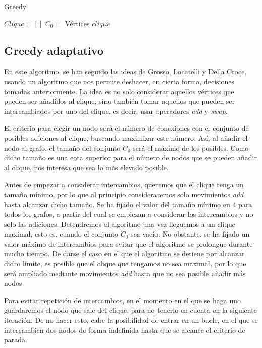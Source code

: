\begin{algorithm}[H]
\caption{Greedy}
  \begin{algorithmic}
  \State $Clique = [ ]$
  \State $C_0 = $ Vértices
  \Repeat
  \Return $clique$
  \EndFunction
  \end{algorithmic}
\end{algorithm}


\subsection{Greedy adaptativo}\label{greedy2}

En este algoritmo, se han seguido las ideas de Grosso, Locatelli y Della Croce,
\citep{grosso:2004} usando un algoritmo que nos permite deshacer, en cierta forma,
decisiones tomadas anteriormente. La idea es no solo considerar aquellos vértices
que pueden ser añadidos al clique, sino también tomar aquellos que pueden ser
intercambiados por uno del clique, es decir, usar operadores \textit{add} y \textit{swap}.

El criterio para elegir un nodo será el número de conexiones con el conjunto de
posibles adiciones al clique, buscando maximizar este número. Así, al añadir el
nodo al grafo, el tamaño del conjunto $C_0$ será el máximo de los posibles.
Como dicho tamaño es una cota superior para el número de nodos que se pueden
añadir al clique, nos interesa que sea lo más elevado posible.

Antes de empezar a considerar intercambios, queremos que el clique tenga un tamaño
mínimo,  por lo que al principio consideraremos solo movimientos \textit{add} hasta
alcanzar dicho tamaño. Se ha fijado el valor del tamaño mínimo en $4$ para todos
los grafos, a partir del cual se empiezan a considerar los intercambios y no solo las
adiciones. Detendremos el algoritmo una vez lleguemos a un clique maximal, esto es,
cuando el conjunto $C_0$ sea vacío. No obstante, se ha fijado un valor máximo de
intercambios para evitar que el algoritmo se prolongue durante mucho tiempo. De darse
el caso en el que el algoritmo se detiene por alcanzar dicho límite, es posible que
el clique que tengamos no sea maximal, por lo que será ampliado mediante movimientos
\textit{add} hasta que no sea posible añadir más nodos.

Para evitar repetición de intercambios, en el momento en el que se haga uno guardaremos
el nodo que sale del clique, para no tenerlo en cuenta en la siguiente iteración.
De no hacer esto, cabe la posibilidad de entrar en un bucle, en el que se
intercambien dos nodos de forma indefinida hasta que se alcance el criterio de parada.

